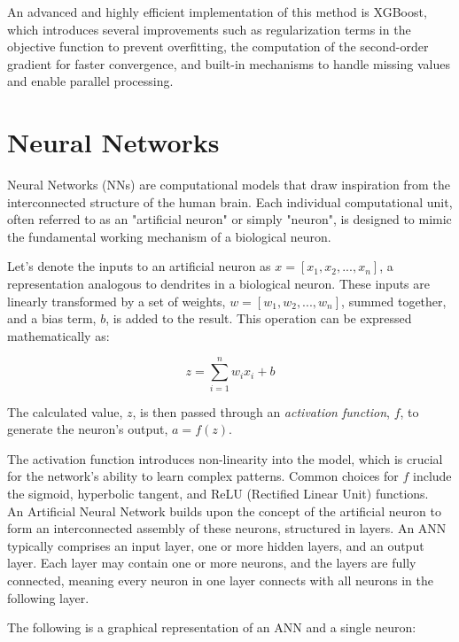 An advanced and highly efficient implementation of this method is XGBoost, which introduces several improvements such as regularization terms in the objective function to prevent overfitting, the computation of the second-order gradient for faster convergence, and built-in mechanisms to handle missing values and enable parallel processing.


\section{Neural Networks}
Neural Networks (NNs) are computational models that draw inspiration from the interconnected structure of the human brain. Each individual computational unit, often referred to as an "artificial neuron" or simply "neuron", is designed to mimic the fundamental working mechanism of a biological neuron.

Let's denote the inputs to an artificial neuron as $ x = [x_1, x_2, ..., x_n] $, a representation analogous to dendrites in a biological neuron. These inputs are linearly transformed by a set of weights, $ w = [w_1, w_2, ..., w_n] $, summed together, and a bias term, $ b $, is added to the result. This operation can be expressed mathematically as:

\[
z = \sum_{i=1}^{n} w_i x_i + b 
\]

The calculated value, $ z $, is then passed through an \textit{activation function}, $ f $, to generate the neuron's output, $ a = f(z) $.


The activation function introduces non-linearity into the model, which is crucial for the network's ability to learn complex patterns. Common choices for $ f $ include the sigmoid, hyperbolic tangent, and ReLU (Rectified Linear Unit) functions.\\

An Artificial Neural Network builds upon the concept of the artificial neuron to form an interconnected assembly of these neurons, structured in layers. An ANN typically comprises an input layer, one or more hidden layers, and an output layer. Each layer may contain one or more neurons, and the layers are fully connected, meaning every neuron in one layer connects with all neurons in the following layer.

The following is a graphical representation of an ANN and a single neuron:



